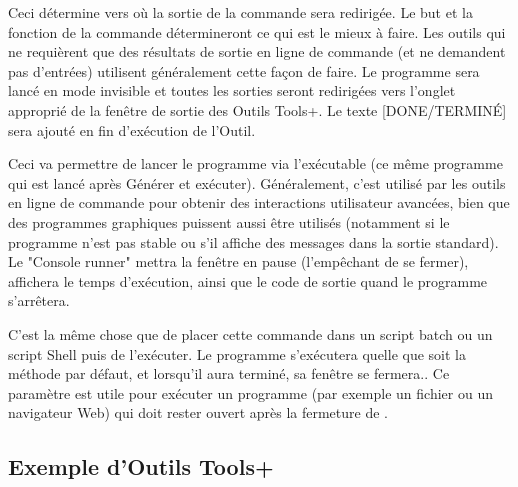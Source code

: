 
Ceci détermine vers où la sortie de la commande sera redirigée. Le but et la fonction de la commande détermineront ce qui est le mieux à faire.
Les outils qui ne requièrent que des résultats de sortie en ligne de commande (et ne demandent pas d'entrées) utilisent généralement cette façon de faire. Le programme sera lancé en mode invisible et toutes les sorties seront redirigées vers l'onglet approprié de la fenêtre de sortie des Outils Tools+. Le texte [DONE/TERMINÉ] sera ajouté en fin d'exécution de l'Outil.



Ceci va permettre de lancer le programme via l'exécutable  (ce même programme qui est lancé après Générer et exécuter). Généralement, c'est utilisé par les outils en ligne de commande pour obtenir des interactions utilisateur avancées, bien que des programmes graphiques puissent aussi être utilisés (notamment si le programme n'est pas stable ou s'il affiche des messages dans la sortie standard). Le "Console runner" mettra la fenêtre en pause (l'empêchant de se fermer), affichera le temps d'exécution, ainsi que le code de sortie quand le programme s'arrêtera.

C'est la même chose que de placer cette commande dans un script batch ou un script Shell puis de l'exécuter. Le programme s'exécutera quelle que soit la méthode par défaut, et lorsqu'il aura terminé, sa fenêtre se fermera.. Ce paramètre est utile pour exécuter un programme (par exemple un fichier ou un navigateur Web) qui doit rester ouvert après la fermeture de \codeblocks.


\subsection{Exemple d'Outils Tools+}


